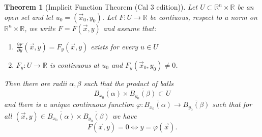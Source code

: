 \documentclass[10pt]{article}
\newtheorem{thm}{Theorem}[section]
\theoremstyle{definition}
\theoremstyle{remark}
\newcommand{\bbR}{\mathbb{R}}
\begin{document}
\begin{thm}[Implicit Function Theorem (Cal 3 edition)]\label{thm:IFT}
  Let $U \subset \bbR^n\times \bbR$ be an open set and let $u_0 = (\vec x_0,y_0)$. Let $F:U \to \bbR$ be contiuous, respect to a norm on $\bbR^n\times \bbR$, we write $F=F(\vec x,y)$ and assume that:
\begin{enumerate}
\item $\displaystyle \frac{\partial F}{\partial y}(\vec x,y) = F_y(\vec x,y)$ exists for every $u \in U$
\item $F_y:U \to \bbR$ is continuous at $u_0$ and $F_y(\vec x_0,y_0) \neq 0$.
\end{enumerate}
Then there are radii $\alpha,\beta$ such that the product of balls\[
  \overline{B_{x_0}(\alpha)}\times \overline{B_{y_0}(\beta)} \subset U
  \] and there is a unique continuous function $\varphi:\overline{B_{x_0}(\alpha)} \to \overline{B_{y_0}(\beta)}$ such that for all $(\vec x,y) \in \overline{B_{x_0}(\alpha)}\times \overline{B_{y_0}(\beta)}$ we have\[
        F(\vec x,y) = 0 \Leftrightarrow y = \varphi(\vec x).
        \]
\end{thm}
\end{document}
